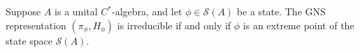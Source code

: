 Suppose $A$ is a unital $C^*$-algebra, and let $\phi \in \mathcal{S}(A)$ be a state. The GNS representation $(\pi_\phi, H_\phi)$ is irreducible if and only if $\phi$ is an extreme point of the state space $\mathcal{S}(A)$.
